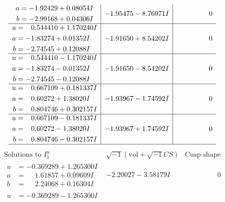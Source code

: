 \documentclass[1p]{elsarticle_modified}
\theoremstyle{definition}
\newcommand{\I}{\sqrt{-1}}
\begin{document}
$$\begin{array}{c|c|c}
\begin{aligned}
a &= -1.92429 + 0.08054 I \\
b &= -2.99168 + 0.04306 I\end{aligned}
 & -1.95475 - 8.76971 I & \phantom{-0.000000 } 0 \\ \hline\begin{aligned}
u &= \phantom{-}0.544410 + 1.170240 I \\
a &= -1.83274 + 0.01352 I \\
b &= -2.74545 + 0.12088 I\end{aligned}
 & -1.91650 + 8.54202 I & \phantom{-0.000000 } 0 \\ \hline\begin{aligned}
u &= \phantom{-}0.544410 - 1.170240 I \\
a &= -1.83274 - 0.01352 I \\
b &= -2.74545 - 0.12088 I\end{aligned}
 & -1.91650 - 8.54202 I & \phantom{-0.000000 } 0 \\ \hline\begin{aligned}
u &= \phantom{-}0.667109 + 0.181337 I \\
a &= \phantom{-}0.60272 + 1.38020 I \\
b &= \phantom{-}0.804746 + 0.302157 I\end{aligned}
 & -1.93967 - 1.74592 I & \phantom{-0.000000 } 0 \\ \hline\begin{aligned}
u &= \phantom{-}0.667109 - 0.181337 I \\
a &= \phantom{-}0.60272 - 1.38020 I \\
b &= \phantom{-}0.804746 - 0.302157 I\end{aligned}
 & -1.93967 + 1.74592 I & \phantom{-0.000000 } 0\\
 \hline 
 \end{array}$$\newpage$$\begin{array}{c|c|c}  
\text{Solutions to }I^u_{1}& \I (\text{vol} + \sqrt{-1}CS) & \text{Cusp shape}\\
 \hline 
\begin{aligned}
u &= -0.369289 + 1.265300 I \\
a &= \phantom{-}1.61857 + 0.09609 I \\
b &= \phantom{-}2.24068 + 0.16304 I\end{aligned}
 & -2.20027 - 3.58179 I & \phantom{-0.000000 } 0 \\ \hline\begin{aligned}
u &= -0.369289 - 1.265300 I \\

\end{aligned}
\end{array}$$
\end{document}
